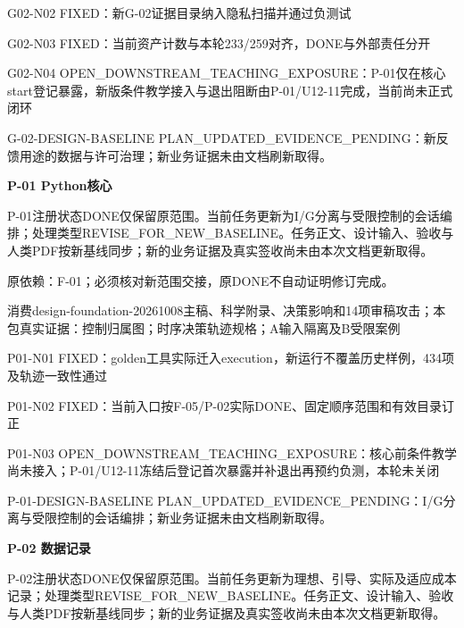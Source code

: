 \documentclass[11pt,a4paper]{article}
\newcommand{\reviewsection}[1]{\par\Needspace{5\baselineskip}\vspace{10pt}\begin{center}{\titlelatin\titlecjk\bfseries\fontsize{14}{20}\selectfont #1}\end{center}}
\begin{document}
G02-\allowbreak{}N02 FIXED：新G-\allowbreak{}02证据目录纳入隐私扫描并通过负测试


G02-\allowbreak{}N03 FIXED：当前资产计数与本轮233/\allowbreak{}259对齐，DONE与外部责任分开


G02-\allowbreak{}N04 OPEN\_\allowbreak{}DOWNSTREAM\_\allowbreak{}TEACHING\_\allowbreak{}EXPOSURE：P-\allowbreak{}01仅在核心start登记暴露，新版条件教学接入与退出阻断由P-\allowbreak{}01/\allowbreak{}U12-\allowbreak{}11完成，当前尚未正式闭环


G-\allowbreak{}02-\allowbreak{}DESIGN-\allowbreak{}BASELINE PLAN\_\allowbreak{}UPDATED\_\allowbreak{}EVIDENCE\_\allowbreak{}PENDING：新反馈用途的数据与许可治理；新业务证据未由文档刷新取得。


\reviewsection{P-\allowbreak{}01 Python核心}
P-\allowbreak{}01注册状态DONE仅保留原范围。当前任务更新为I/\allowbreak{}G分离与受限控制的会话编排；处理类型REVISE\_\allowbreak{}FOR\_\allowbreak{}NEW\_\allowbreak{}BASELINE。任务正文、设计输入、验收与人类PDF按新基线同步；新的业务证据及真实签收尚未由本次文档更新取得。


原依赖：F-\allowbreak{}01；必须核对新范围交接，原DONE不自动证明修订完成。


消费design-\allowbreak{}foundation-\allowbreak{}20261008主稿、科学附录、决策影响和14项审稿攻击；本包真实证据：控制归属图；时序决策轨迹规格；A输入隔离及B受限案例


P01-\allowbreak{}N01 FIXED：golden工具实际迁入execution，新运行不覆盖历史样例，434项及轨迹一致性通过


P01-\allowbreak{}N02 FIXED：当前入口按F-\allowbreak{}05/\allowbreak{}P-\allowbreak{}02实际DONE、固定顺序范围和有效目录订正


P01-\allowbreak{}N03 OPEN\_\allowbreak{}DOWNSTREAM\_\allowbreak{}TEACHING\_\allowbreak{}EXPOSURE：核心前条件教学尚未接入；P-\allowbreak{}01/\allowbreak{}U12-\allowbreak{}11冻结后登记首次暴露并补退出再预约负测，本轮未关闭


P-\allowbreak{}01-\allowbreak{}DESIGN-\allowbreak{}BASELINE PLAN\_\allowbreak{}UPDATED\_\allowbreak{}EVIDENCE\_\allowbreak{}PENDING：I/\allowbreak{}G分离与受限控制的会话编排；新业务证据未由文档刷新取得。


\reviewsection{P-\allowbreak{}02 数据记录}
P-\allowbreak{}02注册状态DONE仅保留原范围。当前任务更新为理想、引导、实际及适应成本记录；处理类型REVISE\_\allowbreak{}FOR\_\allowbreak{}NEW\_\allowbreak{}BASELINE。任务正文、设计输入、验收与人类PDF按新基线同步；新的业务证据及真实签收尚未由本次文档更新取得。
\end{document}
